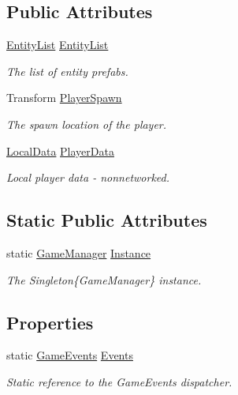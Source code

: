 \subsection*{Public Attributes}
\begin{DoxyCompactItemize}
\item 
\hyperlink{class_skyrates_1_1_common_1_1_entity_1_1_entity_list}{Entity\-List} \hyperlink{class_skyrates_1_1_client_1_1_game_1_1_game_manager_a6cd625a0d48f736b04afc3ec98e4ed53}{Entity\-List}
\begin{DoxyCompactList}\small\item\em The list of entity prefabs. \end{DoxyCompactList}\item 
Transform \hyperlink{class_skyrates_1_1_client_1_1_game_1_1_game_manager_ade8d1e4254dfb7141f1365a5751ef987}{Player\-Spawn}
\begin{DoxyCompactList}\small\item\em The spawn location of the player. \end{DoxyCompactList}\item 
\hyperlink{class_skyrates_1_1_client_1_1_data_1_1_local_data}{Local\-Data} \hyperlink{class_skyrates_1_1_client_1_1_game_1_1_game_manager_a370a843db6f1bc3d9a3e9a500aad0775}{Player\-Data}
\begin{DoxyCompactList}\small\item\em Local player data -\/ nonnetworked. \end{DoxyCompactList}\end{DoxyCompactItemize}
\subsection*{Static Public Attributes}
\begin{DoxyCompactItemize}
\item 
static \hyperlink{class_skyrates_1_1_client_1_1_game_1_1_game_manager}{Game\-Manager} \hyperlink{class_skyrates_1_1_client_1_1_game_1_1_game_manager_accacf771756ee6a41d2c0ced6bf798ca}{Instance}
\begin{DoxyCompactList}\small\item\em The Singleton\{\-Game\-Manager\} instance. \end{DoxyCompactList}\end{DoxyCompactItemize}
\subsection*{Properties}
\begin{DoxyCompactItemize}
\item 
static \hyperlink{class_skyrates_1_1_client_1_1_game_1_1_event_1_1_game_events}{Game\-Events} \hyperlink{class_skyrates_1_1_client_1_1_game_1_1_game_manager_a0fe4743cbadedfc0ad93d51534f3d339}{Events}
\begin{DoxyCompactList}\small\item\em Static reference to the Game\-Events dispatcher. \end{DoxyCompactList}\end{DoxyCompactItemize}
